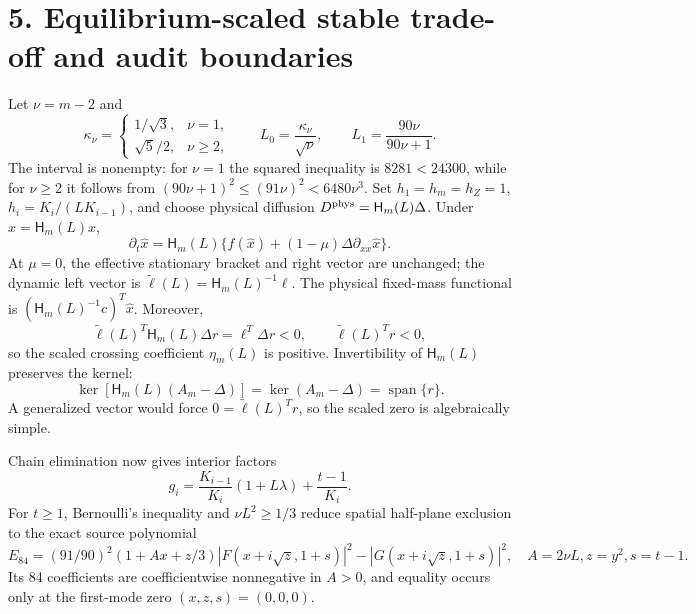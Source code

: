 \documentclass[10pt]{article}
\begin{document}
\newpage
\section*{5. Equilibrium-scaled stable trade-off and audit boundaries}
Let $\nu=m-2$ and
\[
 \kappa_\nu=\begin{cases}1/\sqrt3,&\nu=1,\\
 \sqrt5/2,&\nu\ge2,
 \end{cases}
 \qquad L_0=\frac{\kappa_\nu}{\sqrt\nu},
 \qquad L_1=\frac{90\nu}{90\nu+1}.
\]
The interval is nonempty: for $\nu=1$ the squared inequality is
$8281<24300$, while for $\nu\ge2$ it follows from
$(90\nu+1)^2\le(91\nu)^2<6480\nu^3$.  Set $h_1=h_m=h_Z=1$,
$h_i=K_i/(LK_{i-1})$, and choose physical diffusion
$D^{\rm phys}=\mathsf H_m(L)\Delta$. Under
$\widehat x=\mathsf H_m(L)x$,
\[
\partial_t\widehat x=\mathsf H_m(L)
\{f(\widehat x)+(1-\mu)\Delta\partial_{xx}\widehat x\}.
\]
At $\mu=0$, the effective stationary bracket and right vector are unchanged; the dynamic
left vector is $\widetilde\ell(L)=\mathsf H_m(L)^{-1}\ell$. The physical
fixed-mass functional is $(\mathsf H_m(L)^{-1}c)^T\widehat x$.
Moreover,
\[
\widetilde\ell(L)^T\mathsf H_m(L)\Delta r
=\ell^T\Delta r<0,
\qquad \widetilde\ell(L)^Tr<0,
\]
so the scaled crossing coefficient $\eta_m(L)$ is positive.
Invertibility of $\mathsf H_m(L)$ preserves the kernel:
\[
 \ker[\mathsf H_m(L)(A_m-\Delta)]
 =\ker(A_m-\Delta)=\operatorname{span}\{r\}.
\]
A generalized vector would force $0=\widetilde\ell(L)^Tr$, so the scaled
zero is algebraically simple.

Chain elimination now gives interior factors
\[
g_i=\frac{K_{i-1}}{K_i}(1+L\lambda)+\frac{t-1}{K_i}.
\]
For $t\ge1$, Bernoulli's inequality and $\nu L^2\ge1/3$ reduce spatial
half-plane exclusion to the exact source polynomial
\[
E_{84}=(91/90)^2(1+Ax+z/3)|F(x+i\sqrt z,1+s)|^2
-|G(x+i\sqrt z,1+s)|^2,
\quad A=2\nu L, z=y^2, s=t-1.
\]
Its 84 coefficients are coefficientwise nonnegative in $A>0$, and equality
occurs only at the first-mode zero $(x,z,s)=(0,0,0)$.
\end{document}
